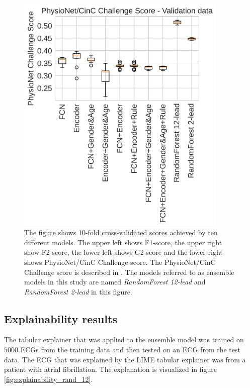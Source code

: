 \begin{figure}[hb!]
{\begin{minipage}[c][1\width]{
	   0.5\textwidth}
	   \includegraphics[width=0.9\textwidth]{Figures/PhysioNetChallenge_score_val}
	   \vspace{0em}
	\end{minipage}}
    \caption{The figure shows 10-fold cross-validated scores achieved by ten different models. The upper left shows F1-score, the upper right show F2-score, the lower-left shows G2-score and the lower right shows PhysioNet/CinC Challenge score. The PhysioNet/CinC Challenge score is described in \cite{alday_classification_2020}. The models referred to as ensemble models in this study are named \textit{RandomForest 12-lead} and \textit{RandomForest 2-lead} in this figure.}
\label{fig:crossval_score}
\end{figure}



\subsection{Explainability results}
The tabular explainer that was applied to the ensemble model was trained on $5000$ ECGs from the training data and then tested on an ECG from the test data. The ECG that was explained by the LIME tabular explainer was from a patient with atrial fibrillation. The explanation is visualized in figure \ref{fig:explainability_rand_12}.

